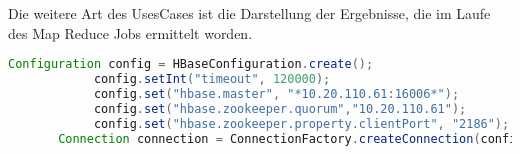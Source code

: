 Die weitere Art des UsesCases ist die Darstellung der Ergebnisse, die im Laufe des Map Reduce Jobs ermittelt worden.


\begin{lstlisting}[language=Java]
Configuration config = HBaseConfiguration.create();
            config.setInt("timeout", 120000);
            config.set("hbase.master", "*10.20.110.61:16006*");
            config.set("hbase.zookeeper.quorum","10.20.110.61");
            config.set("hbase.zookeeper.property.clientPort", "2186");
	   Connection connection = ConnectionFactory.createConnection(config);
\end{lstlisting}